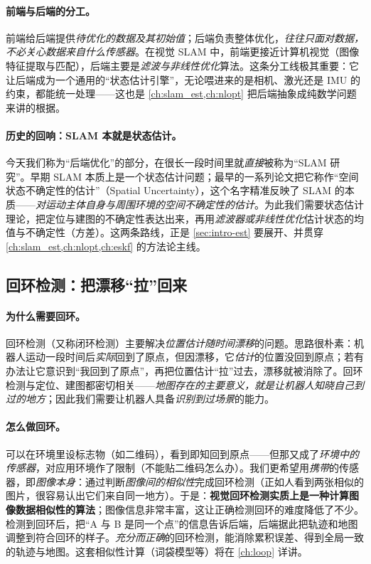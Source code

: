 \paragraph{前端与后端的分工。}
前端给后端提供\emph{待优化的数据及其初始值}；后端负责整体优化，\emph{往往只面对数据，不必关心数据来自什么传感器}\cite{gaoxiang2019slam14}。在视觉 SLAM 中，前端更接近计算机视觉（图像特征提取与匹配），后端主要是\emph{滤波与非线性优化}算法。这条分工线极其重要：它让后端成为一个通用的“状态估计引擎”，无论喂进来的是相机、激光还是 IMU 的约束，都能统一处理——这也是 \cref{ch:slam_est,ch:nlopt} 把后端抽象成纯数学问题来讲的根据。

\paragraph{历史的回响：SLAM 本就是状态估计。}
今天我们称为“后端优化”的部分，在很长一段时间里就\emph{直接}被称为“SLAM 研究”\cite{gaoxiang2019slam14}。早期 SLAM 本质上是一个状态估计问题；最早的一系列论文把它称作“空间状态不确定性的估计”（Spatial Uncertainty），这个名字精准反映了 SLAM 的本质——\emph{对运动主体自身与周围环境的空间不确定性的估计}。为此我们需要状态估计理论，把定位与建图的不确定性表达出来，再用\emph{滤波器或非线性优化}估计状态的均值与不确定性（方差）。这两条路线，正是 \cref{sec:intro-est} 要展开、并贯穿 \cref{ch:slam_est,ch:nlopt,ch:eskf} 的方法论主线。

\subsection{回环检测：把漂移“拉”回来}
\label{sec:intro-loop}
\paragraph{为什么需要回环。}
回环检测（又称闭环检测）主要解决\emph{位置估计随时间漂移}的问题\cite{gaoxiang2019slam14}。思路很朴素：机器人运动一段时间后\emph{实际}回到了原点，但因漂移，它\emph{估计}的位置没回到原点；若有办法让它意识到“我回到了原点”，再把位置估计“拉”过去，漂移就被消除了。回环检测与定位、建图都密切相关——\emph{地图存在的主要意义，就是让机器人知晓自己到过的地方}；因此我们需要让机器人具备\emph{识别到过场景}的能力。

\paragraph{怎么做回环。}
可以在环境里设标志物（如二维码），看到即知回到原点——但那又成了\emph{环境中的传感器}，对应用环境作了限制（不能贴二维码怎么办）。我们更希望用\emph{携带}的传感器，即\emph{图像本身}：通过判断\emph{图像间的相似性}完成回环检测（正如人看到两张相似的图片，很容易认出它们来自同一地方）。于是：\textbf{视觉回环检测实质上是一种计算图像数据相似性的算法}\cite{gaoxiang2019slam14}；图像信息非常丰富，这让正确检测回环的难度降低了不少。检测到回环后，把“A 与 B 是同一个点”的信息告诉后端，后端据此把轨迹和地图调整到符合回环的样子。\emph{充分而正确}的回环检测，能消除累积误差、得到全局一致的轨迹与地图。这套相似性计算（词袋模型等）将在 \cref{ch:loop} 详讲。

